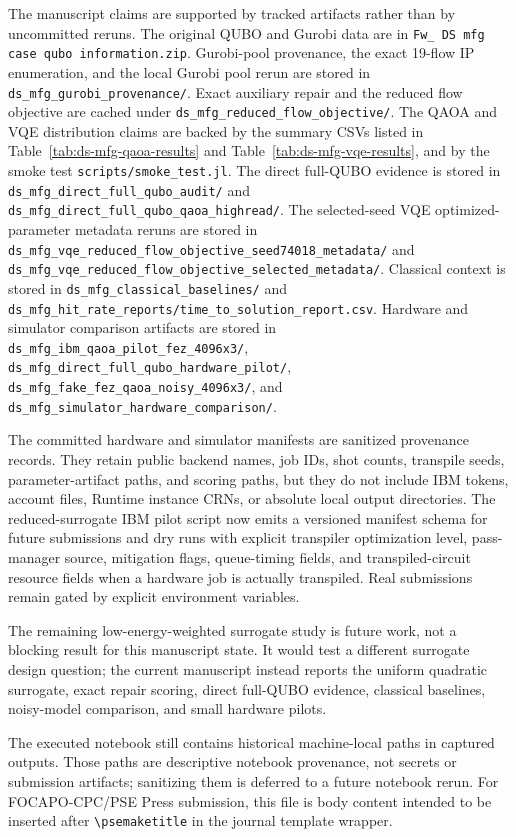 The manuscript claims are supported by tracked artifacts rather than by
uncommitted reruns. The original QUBO and Gurobi data are in
\texttt{Fw\_ DS mfg case qubo information.zip}. Gurobi-pool provenance, the
exact 19-flow IP enumeration, and the local Gurobi pool rerun are stored in
\texttt{ds\_mfg\_gurobi\_provenance/}. Exact auxiliary repair and the reduced
flow objective are cached under
\texttt{ds\_mfg\_reduced\_flow\_objective/}. The QAOA and VQE distribution
claims are backed by the summary CSVs listed in
Table~\ref{tab:ds-mfg-qaoa-results} and
Table~\ref{tab:ds-mfg-vqe-results}, and by the smoke test
\texttt{scripts/smoke\_test.jl}. The direct full-QUBO evidence is stored in
\texttt{ds\_mfg\_direct\_full\_qubo\_audit/} and
\texttt{ds\_mfg\_direct\_full\_qubo\_qaoa\_highread/}. The selected-seed VQE
optimized-parameter metadata reruns are stored in
\texttt{ds\_mfg\_vqe\_reduced\_flow\_objective\_seed74018\_metadata/} and
\texttt{ds\_mfg\_vqe\_reduced\_flow\_objective\_selected\_metadata/}.
Classical context is
stored in \texttt{ds\_mfg\_classical\_baselines/} and
\texttt{ds\_mfg\_hit\_rate\_reports/time\_to\_solution\_report.csv}. Hardware
and simulator comparison artifacts are stored in
\texttt{ds\_mfg\_ibm\_qaoa\_pilot\_fez\_4096x3/},
\texttt{ds\_mfg\_direct\_full\_qubo\_hardware\_pilot/},
\texttt{ds\_mfg\_fake\_fez\_qaoa\_noisy\_4096x3/}, and
\texttt{ds\_mfg\_simulator\_hardware\_comparison/}.

The committed hardware and simulator manifests are sanitized provenance
records. They retain public backend names, job IDs, shot counts, transpile
seeds, parameter-artifact paths, and scoring paths, but they do not include IBM
tokens, account files, Runtime instance CRNs, or absolute local output
directories. The reduced-surrogate IBM pilot script now emits a versioned
manifest schema for future submissions and dry runs with explicit transpiler
optimization level, pass-manager source, mitigation flags, queue-timing fields,
and transpiled-circuit resource fields when a hardware job is actually
transpiled. Real submissions remain gated by explicit environment variables.

The remaining low-energy-weighted surrogate study is future work, not a
blocking result for this manuscript state. It would test a different surrogate
design question; the current manuscript instead reports the uniform quadratic
surrogate, exact repair scoring, direct full-QUBO evidence, classical
baselines, noisy-model comparison, and small hardware pilots.

The executed notebook still contains historical machine-local paths in captured
outputs. Those paths are descriptive notebook provenance, not secrets or
submission artifacts; sanitizing them is deferred to a future notebook rerun.
For FOCAPO-CPC/PSE Press submission, this file is body content intended to be
inserted after \texttt{\textbackslash psemaketitle} in the journal template
wrapper.

